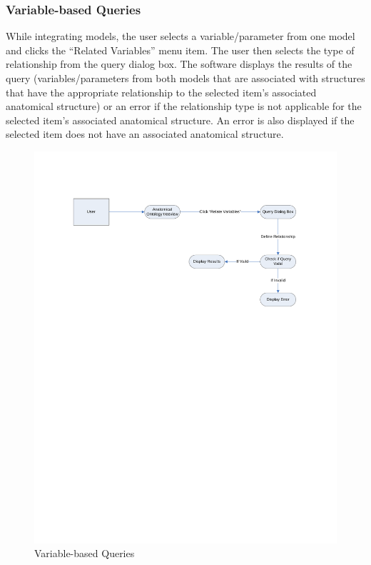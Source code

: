 \documentclass{article}
\begin{document}
\subsubsection{Variable-based Queries}
While integrating models, the user selects a variable/parameter from one model and clicks the ``Related Variables'' menu item. The user then selects the type of relationship from the query dialog box. The software displays the results of the query (variables/parameters from both models that are associated with structures that have the appropriate relationship to the selected item's associated anatomical structure) or an error if the relationship type is not applicable for the selected item's associated anatomical structure. An error is also displayed if the selected item does not have an associated anatomical structure.
\begin{figure}[!htb]
\centering
\includegraphics[width=\textwidth]{./diagrams/query-var}
\caption{Variable-based Queries}
\end{figure}
\end{document}
